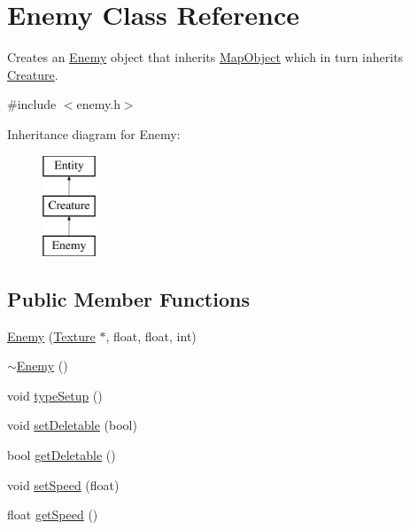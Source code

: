 \hypertarget{class_enemy}{\section{Enemy Class Reference}
\label{class_enemy}
}


Creates an \hyperlink{class_enemy}{Enemy} object that inherits \hyperlink{class_map_object}{Map\+Object} which in turn inherits \hyperlink{class_creature}{Creature}.  




{\ttfamily \#include $<$enemy.\+h$>$}

Inheritance diagram for Enemy\+:\begin{figure}[H]
\begin{center}
\leavevmode
\includegraphics[height=3.000000cm]{class_enemy}
\end{center}
\end{figure}
\subsection*{Public Member Functions}
\begin{DoxyCompactItemize}
\item 
\hyperlink{class_enemy_ae9cfc9f39bd776aaf87eee7346945dd4}{Enemy} (\hyperlink{class_texture}{Texture} $\ast$, float, float, int)
\item 
\hyperlink{class_enemy_ac0eec4755e28c02688065f9657150ac3}{$\sim$\+Enemy} ()
\item 
void \hyperlink{class_enemy_ac50fe15406592d81e276826425b3000b}{type\+Setup} ()
\item 
void \hyperlink{class_enemy_a0b3e1631733e464c755767b894ce3ef4}{set\+Deletable} (bool)
\item 
bool \hyperlink{class_enemy_a37e2cff8cfe21a2ce0245bca77fc84e2}{get\+Deletable} ()
\item 
void \hyperlink{class_enemy_a7185349825042de46d16bad7b1c422d6}{set\+Speed} (float)
\item 
float \hyperlink{class_enemy_acd43fc5766bf7ef886691244e1b66566}{get\+Speed} ()
\end{DoxyCompactItemize}
